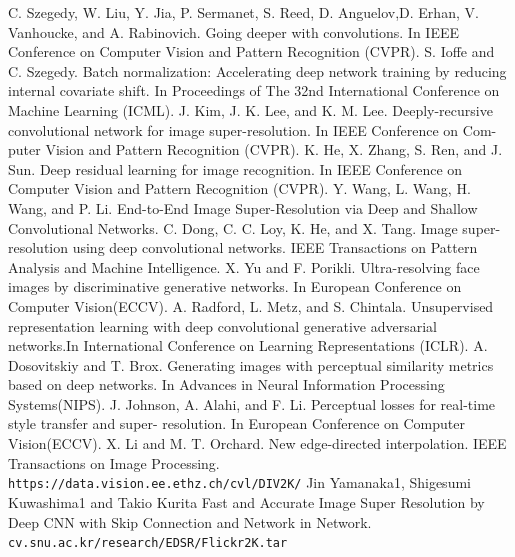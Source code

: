 \documentclass[12pt]{article}
\begin{document}
\begin{thebibliography}{999}
		 C. Szegedy, W. Liu, Y. Jia, P. Sermanet, S. Reed, D. Anguelov,D. Erhan, V. Vanhoucke, and A. Rabinovich. Going deeper with convolutions. In IEEE Conference on Computer Vision and Pattern Recognition (CVPR).
		 S. Ioffe and C. Szegedy. Batch normalization: Accelerating deep network training by reducing internal covariate shift. In Proceedings of The 32nd International Conference on Machine Learning (ICML).
		 J. Kim, J. K. Lee, and K. M. Lee. Deeply-recursive convolutional network for image super-resolution. In IEEE Conference on Com-puter Vision and Pattern Recognition (CVPR).
		 K. He, X. Zhang, S. Ren, and J. Sun. Deep residual learning for image recognition. In IEEE Conference on Computer Vision and Pattern Recognition (CVPR).
		 Y. Wang, L. Wang, H. Wang, and P. Li. End-to-End Image Super-Resolution via Deep and Shallow Convolutional Networks.
		 C. Dong, C. C. Loy, K. He, and X. Tang. Image super-resolution using deep convolutional networks. IEEE Transactions on Pattern Analysis and Machine Intelligence.
		 X. Yu and F. Porikli. Ultra-resolving face images by discriminative generative networks. In European Conference on Computer Vision(ECCV).
		 A. Radford, L. Metz, and S. Chintala. Unsupervised representation learning  with  deep convolutional generative adversarial networks.In International Conference on Learning Representations (ICLR).
		 A. Dosovitskiy and T. Brox. Generating images with perceptual similarity metrics based on deep networks. In Advances in Neural Information Processing Systems(NIPS).
		 J. Johnson, A. Alahi, and F. Li. Perceptual losses for real-time style transfer and super- resolution. In European Conference on Computer Vision(ECCV).
		 X. Li and M. T. Orchard. New edge-directed interpolation. IEEE Transactions on Image Processing.
		 \texttt{https://data.vision.ee.ethz.ch/cvl/DIV2K/}
		 Jin Yamanaka1, Shigesumi Kuwashima1 and Takio Kurita Fast and Accurate Image Super Resolution by Deep CNN with Skip Connection and Network in Network.
		 \texttt{cv.snu.ac.kr/research/EDSR/Flickr2K.tar}
	\end{thebibliography}
\end{document}
